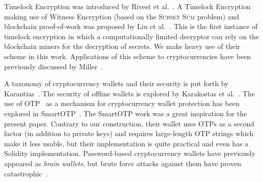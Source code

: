 Timelock Encryption was introduced by Rivest et al.~\cite{timelock}. A Timelock Encryption
making use of Witness Encryption (based on the \textsc{Subset Sum} problem) and blockchain proof-of-work was proposed by Liu et
al.~\cite{timelock-bitcoin}. This is the first instance of timelock encryption in which
a computationally limited decryptor can rely on the blockchain miners for the decryption
of secrets. We make heavy use of their scheme in this work. Applications of this scheme to cryptocurrencies
have been previously discussed by Miller~\cite{miller-timelock}.

A taxonomy of cryptocurrency wallets and their security is put forth by Karantias~\cite{wallet-taxonomy}.
The security of offline wallets is explored by Karakostas et al.~\cite{hardware-wallets}.
The use of OTP~\cite{rfc6238,rfc4226} as a mechanism for cryptocurrency wallet protection has been explored in SmartOTP~\cite{smartotp}.
The SmartOTP work was a great inspiration for the present paper. Contrary to our construction, their
wallet uses OTPs as a second factor (in addition to private keys) and requires large-length OTP strings
which make it less usable, but their implementation is quite practical and even has a Solidity implementation.
Password-based cryptocurrency wallets have previously appeared as \emph{brain wallets},
but brute force attacks against them have proven catastrophic~\cite{brain-drain}.
